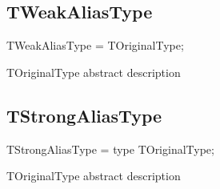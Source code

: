 \documentclass{report}
\begin{document}
\subsection*{TWeakAliasType}
\begin{list}{}{
\setlength{\itemindent}{0cm}
\setlength{\listparindent}{0cm}
\setlength{\leftmargin}{\evensidemargin}
\addtolength{\leftmargin}{\tmplength}
\settowidth{\labelsep}{X}
\addtolength{\leftmargin}{\labelsep}
\setlength{\labelwidth}{\tmplength}
}
\begin{flushleft}
\item[\textbf{Declaration}\hfill]
\begin{ttfamily}
TWeakAliasType = TOriginalType;\end{ttfamily}


\end{flushleft}
\par
\item[\textbf{Description}]
TOriginalType abstract description

\end{list}
\subsection*{TStrongAliasType}
\begin{list}{}{
\setlength{\itemindent}{0cm}
\setlength{\listparindent}{0cm}
\setlength{\leftmargin}{\evensidemargin}
\addtolength{\leftmargin}{\tmplength}
\settowidth{\labelsep}{X}
\addtolength{\leftmargin}{\labelsep}
\setlength{\labelwidth}{\tmplength}
}
\begin{flushleft}
\item[\textbf{Declaration}\hfill]
\begin{ttfamily}
TStrongAliasType = type TOriginalType;\end{ttfamily}


\end{flushleft}
\par
\item[\textbf{Description}]
TOriginalType abstract description

\end{list}
\end{document}
